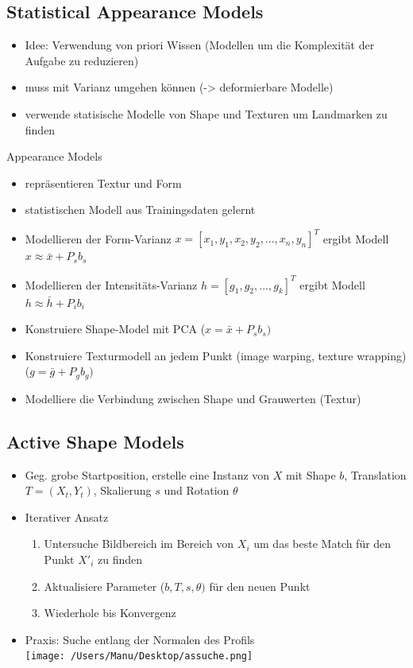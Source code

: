 \documentclass[paper=a4, fontsize=11pt]{scrartcl} %
\numberwithin{equation}{section} %
\numberwithin{figure}{section} %
\numberwithin{table}{section} %
\begin{document}
\subsection{Statistical Appearance Models}

\begin{itemize}
\item Idee: Verwendung von priori Wissen (Modellen um die Komplexität der Aufgabe zu reduzieren)
\item muss mit Varianz umgehen können (-> deformierbare Modelle)
\item verwende statisische Modelle von Shape und Texturen um Landmarken zu finden
\end{itemize}

Appearance Models
\begin{itemize}
\item repräsentieren Textur und Form
\item statistischen Modell aus Trainingsdaten gelernt
\item Modellieren der Form-Varianz $x = [x_1,y_1,x_2,y_2,...,x_n,y_n]^T$ ergibt Modell $x \approx \bar{x} + P_s b_s$
\item Modellieren der Intensitäts-Varianz $h = [g_1,g_2,...,g_k]^T$ ergibt Modell $h \approx \bar{h} + P_i b_i$
\item Konstruiere Shape-Model mit PCA ($x = \bar{x} + P_s b_s)$
\item Konstruiere Texturmodell an jedem Punkt (image warping, texture wrapping) ($g = \bar{g} + P_g b_g)$
\item Modelliere die Verbindung zwischen Shape und Grauwerten (Textur)
\end{itemize}

\subsection{Active Shape Models}

\begin{itemize}
\item Geg. grobe Startposition, erstelle eine Instanz von $X$ mit Shape $b$, Translation $T=(X_t,Y_t)$, Skalierung $s$ und Rotation $\theta$
\item Iterativer Ansatz
\begin{enumerate}
\item Untersuche Bildbereich im Bereich von $X_i$ um das beste Match für den Punkt $X'_i$ zu finden
\item Aktualisiere Parameter ($b,T,s,\theta)$ für den neuen Punkt
\item Wiederhole bis Konvergenz
\end{enumerate}
\item Praxis: Suche entlang der Normalen des Profils\\ 
\texttt{[image: /Users/Manu/Desktop/assuche.png]}
\end{itemize}
\end{document}
